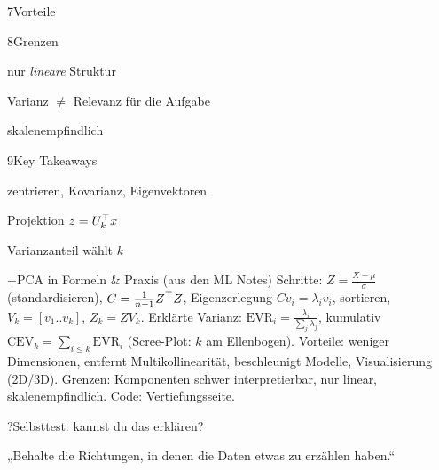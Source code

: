 \begin{hngrid}
\begin{hnp}[raster multicolumn=2,acc=hngreen]{7}{Vorteile}
\end{hnp}
%
\begin{hnp}[raster multicolumn=2,acc=hnred]{8}{Grenzen}
\begin{hncon}
\item nur \emph{lineare} Struktur
\item Varianz $\ne$ Relevanz für die Aufgabe
\item skalenempfindlich
\end{hncon}
\end{hnp}
%
\begin{hnp}[raster multicolumn=2,acc=hnorange]{9}{Key Takeaways}
\begin{hnchk}
\item zentrieren, Kovarianz, Eigenvektoren
\item Projektion $z=U_k^{\top} x$
\item Varianzanteil wählt $k$
\end{hnchk}
\end{hnp}
%
\begin{hnp}[raster multicolumn=6,acc=hnteal]{+}{PCA in Formeln \& Praxis (aus den ML Notes)}
Schritte: $Z=\frac{X-\mu}{\sigma}$ (standardisieren), $C=\frac1{n-1}Z^{\top} Z$, Eigenzerlegung $Cv_i=\lambda_iv_i$, sortieren, $V_k=[v_1..v_k]$, $Z_k=ZV_k$. Erklärte Varianz: $\mathrm{EVR}_i=\frac{\lambda_i}{\sum_j\lambda_j}$, kumulativ $\mathrm{CEV}_k=\sum_{i\le k}\mathrm{EVR}_i$ (Scree-Plot: $k$ am Ellenbogen). Vorteile: weniger Dimensionen, entfernt Multikollinearität, beschleunigt Modelle, Visualisierung (2D/3D). Grenzen: Komponenten schwer interpretierbar, nur linear, skalenempfindlich. Code: Vertiefungsseite.
\end{hnp}
%
\begin{hnp}[raster multicolumn=6,acc=hnpurple,colback=hnlilac!30]{?}{Selbsttest: kannst du das erklären?}
\end{hnp}
%
\begin{hnbanner}[raster multicolumn=6]
„Behalte die Richtungen, in denen die Daten etwas zu erzählen haben.“
\end{hnbanner}
\end{hngrid}
